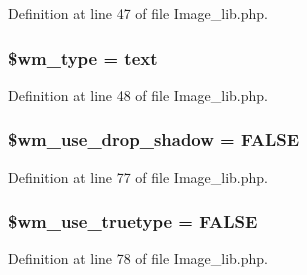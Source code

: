Definition at line 47 of file Image\+\_\+lib.\+php.

\subsubsection[{\texorpdfstring{\$wm\+\_\+type}{$wm_type}}]{\setlength{\rightskip}{0pt plus 5cm}\$wm\+\_\+type = \textquotesingle{}text\textquotesingle{}}\hypertarget{class_c_i___image__lib_a530808b613890909a92bf6096401e9be}{}\label{class_c_i___image__lib_a530808b613890909a92bf6096401e9be}


Definition at line 48 of file Image\+\_\+lib.\+php.

\subsubsection[{\texorpdfstring{\$wm\+\_\+use\+\_\+drop\+\_\+shadow}{$wm_use_drop_shadow}}]{\setlength{\rightskip}{0pt plus 5cm}\$wm\+\_\+use\+\_\+drop\+\_\+shadow = F\+A\+L\+SE}\hypertarget{class_c_i___image__lib_a49b77ed476cebe5f357705e7a9c4ccce}{}\label{class_c_i___image__lib_a49b77ed476cebe5f357705e7a9c4ccce}


Definition at line 77 of file Image\+\_\+lib.\+php.

\subsubsection[{\texorpdfstring{\$wm\+\_\+use\+\_\+truetype}{$wm_use_truetype}}]{\setlength{\rightskip}{0pt plus 5cm}\$wm\+\_\+use\+\_\+truetype = F\+A\+L\+SE}\hypertarget{class_c_i___image__lib_a0415d8aa18349f21751f7a81255918ad}{}\label{class_c_i___image__lib_a0415d8aa18349f21751f7a81255918ad}


Definition at line 78 of file Image\+\_\+lib.\+php.

